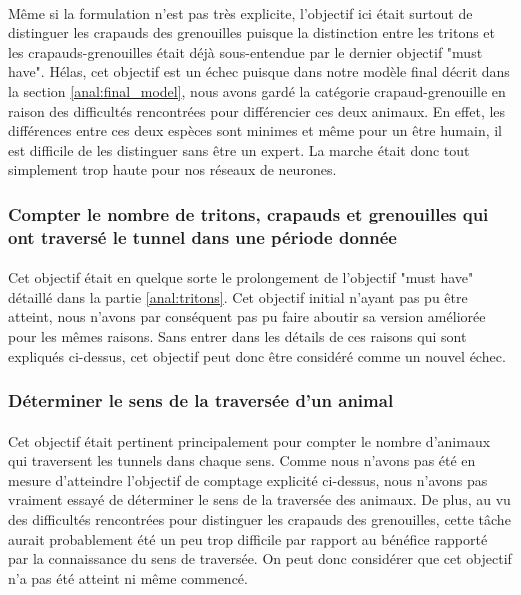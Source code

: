 \paragraph{} Même si la formulation n'est pas très explicite, l'objectif ici était surtout de distinguer les crapauds des grenouilles puisque la distinction entre les tritons et les crapauds-grenouilles était déjà sous-entendue par le dernier objectif "must have". Hélas, cet objectif est un échec puisque dans notre modèle final décrit dans la section \ref{anal:final_model}, nous avons gardé la catégorie crapaud-grenouille en raison des difficultés rencontrées pour différencier ces deux animaux. En effet, les différences entre ces deux espèces sont minimes et même pour un être humain, il est difficile de les distinguer sans être un expert. La marche était donc tout simplement trop haute pour nos réseaux de neurones.

\subsubsection{Compter le nombre de tritons, crapauds et grenouilles qui ont traversé le tunnel dans une période donnée}
\paragraph{} Cet objectif était en quelque sorte le prolongement de l'objectif "must have" détaillé dans la partie \ref{anal:tritons}. Cet objectif initial n'ayant pas pu être atteint, nous n'avons par conséquent pas pu faire aboutir sa version améliorée pour les mêmes raisons. Sans entrer dans les détails de ces raisons qui sont expliqués ci-dessus, cet objectif peut donc être considéré comme un nouvel échec.

\subsubsection{Déterminer le sens de la traversée d’un animal}
\paragraph{} Cet objectif était pertinent principalement pour compter le nombre d'animaux qui traversent les tunnels dans chaque sens. Comme nous n'avons pas été en mesure d'atteindre l'objectif de comptage explicité ci-dessus, nous n'avons pas vraiment essayé de déterminer le sens de la traversée des animaux. De plus, au vu des difficultés rencontrées pour distinguer les crapauds des grenouilles, cette tâche aurait probablement été un peu trop difficile par rapport au bénéfice rapporté par la connaissance du sens de traversée. On peut donc considérer que cet objectif n'a pas été atteint ni même commencé.

